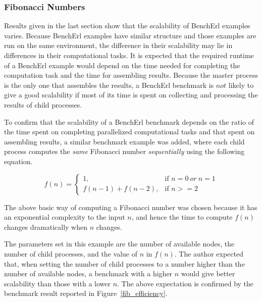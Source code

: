 \subsubsection{Fibonacci Numbers}

Results given in the last section show that the scalability of BenchErl 
examples varies.  Because BenchErl examples have similar structure and those 
examples are run on the same environment, the difference in their scalability 
may lie in differences in their computational tasks.  It is expected 
that the required runtime of a BenchErl example would depend on the time needed 
for completing the computation task and the time for assembling results.  
Because the master process is the only one that assembles the results, a 
BenchErl benchmark is $not$ likely to give a good scalability if most of its 
time is spent on collecting and processing the results of child processes.

To confirm that the scalability of a BenchErl benchmark depends on the ratio 
of the time spent on completing parallelized computational tasks and that spent 
on assembling results, a similar benchmark example was added, where each child 
process computes the {\it same} Fibonacci number {\it sequentially} using the following equation.

\begin{equation}
 f(n) = \begin{cases} 
            1,             & \mbox{if } n = 0 \ { or }\  n = 1  \\ 
            f(n-1)+f(n-2), & \mbox{if } n >=2
         \end{cases}
\end{equation}

The above basic way of computing a Fibonacci number was chosen because it has 
an exponential complexity to the input $n$, and hence the time to compute 
$f(n)$ changes dramatically when $n$ changes.

The parameters set in this example are the number of available nodes, the 
number of child processes, and the value of $n$ in $f(n)$.  The author expected 
that, when setting the number of child processes to a number higher 
than the number of available nodes, a benchmark with a higher $n$ would give 
better scalability than those with a lower $n$.  The above expectation
is confirmed by the benchmark result reported in Figure~\ref{fib_efficiency}.

